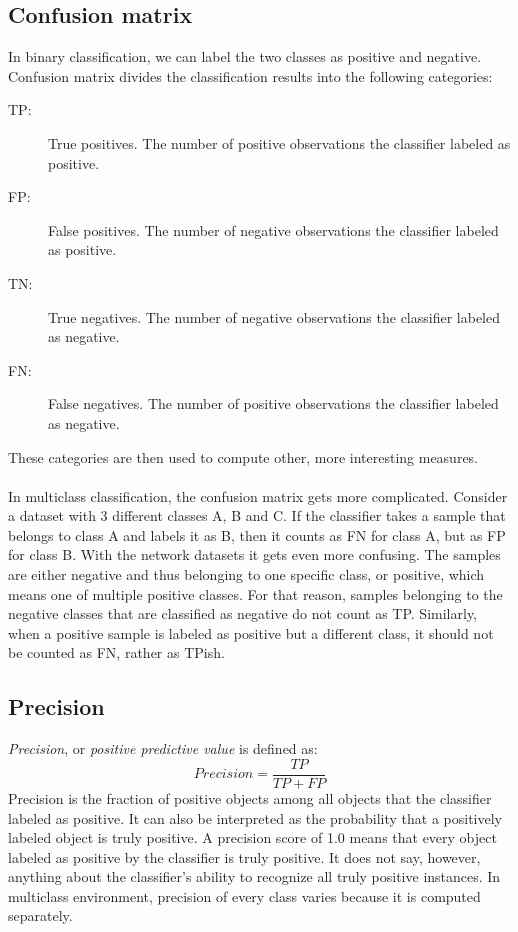 \documentclass{article}
\begin{document}
    \subsection{Confusion matrix}
      In binary classification, we can label the two classes as positive and negative. Confusion matrix divides the classification results into the following categories:
      \begin{description}
      \item [TP:] True positives. The number of positive observations the classifier labeled as positive.
      \item [FP:] False positives. The number of negative observations the classifier labeled as positive.
      \item [TN:] True negatives. The number of negative observations the classifier labeled as negative.
      \item [FN:] False negatives. The number of positive observations the classifier labeled as negative.
      \end{description}
      These categories are then used to compute other, more interesting measures.
      \\~\\
      In multiclass classification, the confusion matrix gets more complicated. Consider a dataset with 3 different classes A, B and C. If the classifier takes a sample that belongs to class A and labels it as B, then it counts as FN for class A, but as FP for class B. With the network datasets it gets even more confusing. The samples are either negative and thus belonging to one specific class, or positive, which means one of multiple positive classes. For that reason, samples belonging to the negative classes that are classified as negative do not count as TP. Similarly, when a positive sample is labeled as positive but a different class, it should not be counted as FN, rather as TPish.
    \newpage
    \subsection{Precision}
      {\it Precision}, or {\it positive predictive value} is defined as:
      \begin{displaymath}
        Precision = \frac{TP}{TP + FP}
      \end{displaymath}
      Precision is the fraction of positive objects among all objects that the classifier labeled as positive. It can also be interpreted as the probability that a positively labeled object is truly positive. A precision score of 1.0 means that every object labeled as positive by the classifier is truly positive. It does not say, however, anything about the classifier's ability to recognize all truly positive instances. In multiclass environment, precision of every class varies because it is computed separately.
\end{document}
